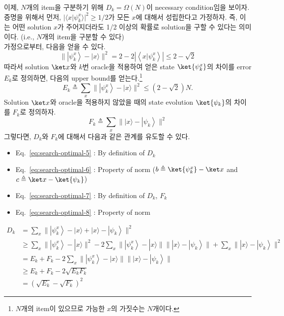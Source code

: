 \vspace{1em}
이제, $N$개의 item을 구분하기 위해 $D_k = \Omega(N)$이 necessary condition임을 보이자. \\
증명을 위해서 먼저, $|\langle x | \psi_k^x \rangle |^2 \ge 1/2$가 모든 $x$에 대해서 성립한다고 가정하자. 즉, 이는 어떤 solution $x$가 주어지더라도 1/2 이상의 확률로 solution을 구할 수 있다는 의미이다. (i.e., $N$개의 item을 구분할 수 있다) \\
가정으로부터, 다음을 얻을 수 있다.
\begin{equation*}
  \|\left|\psi_k^x\right\rangle-|x\rangle \|^2=2-2\left|\left\langle x | \psi_k^x\right\rangle\right| \leq 2-\sqrt{2}
\end{equation*}
따라서 solution $\ket x$와 $k$번 oracle을 적용하여 얻은 state $\ket{\psi^x_k}$의 차이를 error $E_k$로 정의하면, 다음의 upper bound를 얻는다.\footnote{$N$개의 item이 있으므로 가능한 $x$의 가짓수는 $N$개이다.}
\begin{equation}
  E_k \triangleq \sum_x \|\left|\psi_k^x\right\rangle-|x\rangle \|^2 \leq(2-\sqrt{2}) N . \label{eq:search-optimal-ek}
\end{equation}
Solution $\ket x$와 oracle을 적용하지 않았을 때의 state evolution $\ket{\psi_k}$의 차이를 $F_k$로 정의하자.
\begin{equation*}
  F_k \triangleq \sum_x \||x\rangle-\left|\psi_k\right\rangle \|^2
\end{equation*}
그렇다면, $D_k$와 $F_k$에 대해서 다음과 같은 관계를 유도할 수 있다. 
\begin{itemize}
  \item Eq.~\eqref{eq:search-optimal-5} : By definition of $D_k$ 
  \item Eq.~\eqref{eq:search-optimal-6} : Property of norm ($b \triangleq \ket{\psi^x_k} - \ket x$ and $c \triangleq \ket x - \ket{\psi_k}$)
  \item Eq.~\eqref{eq:search-optimal-7} : By definition of $D_k$, $F_k$ 
  \item Eq.~\eqref{eq:search-optimal-8} : Property of norm 
\end{itemize}
\begin{align}
  D_k & =\sum_x \|\left|\psi_k^x\right\rangle-|x\rangle+|x\rangle-\left|\psi_k\right\rangle \|^2 \label{eq:search-optimal-5}\\ 
  & \geq \sum_x \|\left|\psi_k^x\right\rangle-|x\rangle\|^2-2 \sum_x\|\left|\psi_k^x\right\rangle-|x\rangle\| \||x\rangle-\left|\psi_k\right\rangle\|+\sum_x\||x\rangle-\left|\psi_k\right\rangle \|^2\label{eq:search-optimal-6} \\
  & =E_k+F_k-2 \sum_x \|\left|\psi_k^x\right\rangle-|x\rangle\| \||x\rangle-\left|\psi_k\right\rangle \| \label{eq:search-optimal-7} \\
  & \geq E_k+F_k-2 \sqrt{E_k F_k} \label{eq:search-optimal-8} \\
  & =\left(\sqrt{E_k}-\sqrt{F_k}\right)^2\label{eq:search-optimal-9}
\end{align}
